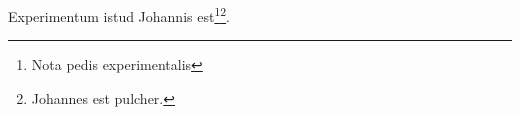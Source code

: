 \documentclass{scrbook}
\begin{document}
Experimentum istud Johannis est\footnote{Nota pedis experimentalis}\footnote{Johannes est pulcher.}.

\newpage
\printindex[res]
\printindex[pers]
\end{document}
